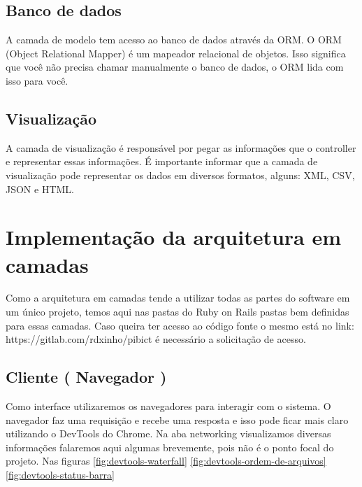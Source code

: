 \subsection{Banco de dados}

A camada de modelo tem acesso ao banco de dados através da ORM. O ORM (Object Relational Mapper) é um mapeador relacional de objetos. Isso significa que você não precisa chamar manualmente o banco de dados, o ORM lida com isso para você.

\subsection{Visualização}

A camada de visualização é responsável por pegar as informações que o controller e representar essas informações. É importante informar que a camada de visualização pode representar os dados em diversos formatos, alguns: XML, CSV, JSON e HTML.

\section{Implementação da arquitetura em camadas}

Como a arquitetura em camadas tende a utilizar todas as partes do software em um único projeto, temos aqui nas pastas do Ruby on Rails pastas bem definidas para essas camadas. Caso queira ter acesso ao código fonte o mesmo está no link: https://gitlab.com/rdxinho/pibict é necessário a solicitação de acesso.


\subsection{Cliente ( Navegador )}

Como interface utilizaremos os navegadores para interagir com o sistema. O navegador faz uma requisição e recebe uma resposta e isso pode ficar mais claro utilizando o DevTools do Chrome. Na aba networking visualizamos diversas informações falaremos aqui algumas brevemente, pois não é o ponto focal do projeto. Nas figuras \ref{fig:devtools-waterfall} \ref{fig:devtools-ordem-de-arquivos} \ref{fig:devtools-status-barra}

